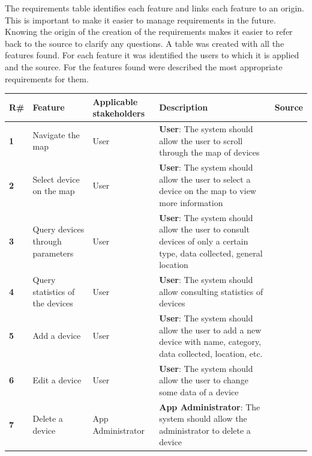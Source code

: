 The requirements table identifies each feature and links each feature to an origin.
\newline
This is important to make it easier to manage requirements in the future.
Knowing the origin of the creation of the requirements makes it easier to
refer back to the source to clarify any questions.
\newline
A table was created with all the features found. For each feature it was identified
the users to which it is applied and the source.
\newline
For the features found were described the most appropriate requirements for
them. \\
\begin{table}[H]
    \centering
    \begin{adjustbox}{width=1\textwidth,center=\textwidth}
    \begin{tabular}{|l|p{}|p{}|p{}|p{}|}
        \hline
        \rowcolor{green!20}
        \textbf{R\#} & \textbf{Feature} & \textbf{Applicable stakeholders} & \textbf{Description} & \textbf{Source} \\
        \hline
        \textbf{1} & Navigate the map & User & \textbf{User}: The system should allow the user to scroll through the map of devices &  \\
        \hline
        \textbf{2} & Select device on the map & User & \textbf{User}: The system should allow the user to select a device on the map to view more information &  \\
        \hline
        \textbf{3} & Query devices through parameters & User & \textbf{User}: The system should allow the user to consult devices of only a certain type, data collected, general location &  \\
        \hline
        \textbf{4} & Query statistics of the devices & User & \textbf{User}: The system should allow consulting statistics of devices &  \\
        \hline
        \textbf{5} & Add a device & User & \textbf{User}: The system should allow the user to add a new device with name, category, data collected, location, etc. &  \\
        \hline
        \textbf{6} & Edit a device & User & \textbf{User}: The system should allow the user to change some data of a device &  \\
        \hline
        \textbf{7} & Delete a device & App Administrator & \textbf{App Administrator}: The system should allow the administrator to delete a device &  \\

\end{tabular}
\end{adjustbox}
\end{table}

